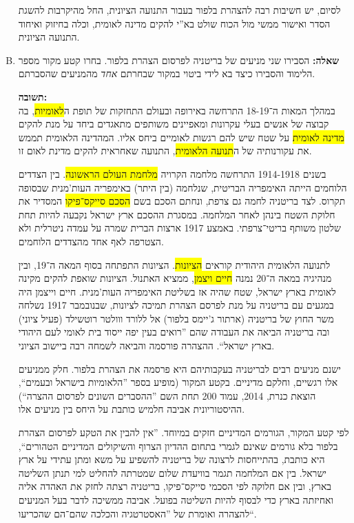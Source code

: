 \documentclass[a4paper]{article}
\newcommand\hl[1]   {\colorbox{yellow}{\!\!#1\!\!}}
\begin{document}
\begin{enumerate}[A.]
			לסיום, יש חשיבות רבה להצהרת בלפור בעבור התנועה הציונית, החל מהיקרבות להשגת הסדר ואישור ממשי מול הכוח שולט בא''י להקים מדינה לאומית, וכלה בחיזוק ואיחוד התנועה הציונית. 
			
			\item \textbf{שאלה: }הסבירו שני מניעים של בריטניה לפרסום הצהרת בלפור. בחרו קטע מקור מספר הלימוד והסבירו כיצד בא לידי ביטוי במקור שבחרתם \textit{אחד} מהמניעים שהסברתם. 
			
			\textbf{תשובה: }\\
			במהלך המאות ה־18-19 התרחשה באירופה ובעולם התחזקות של תופת ה\hl{לאומיות}, בה קבוצה של אנשים בעלי עקרונות ומאפיינים משותפים מתאגדים ביחד על מנת להקים \hl{מדינה לאומית} על שטח שיש להם רגשות לאומיים ביחס אליו. המהדינה הלאומית תממש את עקורנותיה של ה\hl{תנועה הלאומית}, התנועה שאחראית להקים מדינת לאום זו. 
			
			בשנים 1914-1918 התרחשה מלחמה הקרויה \hl{מלחמת העולם הראשונה}. בין הצדדים הלוחמים הייתה האימפריה הבריטית, שנלחמה (בין היתר) באימפריה העות'מנית שבסופה תקרוס. לצד בריטניה לחמה גם צרפת, ונחתם הסכם בשם \hl{הסכם סייקס־פיקו} המסדיר את חלוקת השטח בינהן לאחר המלחמה. במסגרת ההסכם ארץ ישראל נקבעה להיות תחת שלטון משותף בריטי־צרפתי. באמצע 1917 ארצות הברית שמרה על עמדה ניטרלית ולא הצטרפה לאף אחד מהצדדים הלוחמים. 
			
			לתנועה הלאומית היהודית קוראים \hl{הציונות}. הציונות התפתחה בסוף המאה ה־19, ובין מנהיגיה במאה ה־20 נמנה \hl{חיים ויצמן}, ממציא האתנול. הציונות שואפת להקים מקינה לאומית בארץ ישראל, שטח שהיה אז בשליטת האימפריה העות'מנית. חיים וייצמן היה במגעים עם בריטניה על מנת לפרסם הצהרת תמיכה לציונות, שבנובמבר 1917 נשלחה משר החוץ של בריטניה (ארתור ג'יימס בלפור) אל ללורד ווולטר רוטשילד (פעיל ציוני) ובה בריטניה הביאה את העבודה שהם ''רואים בעין יפה ייסוד בית לאומי לעם היהודי בארץ ישראל``. ההצהרה פורסמה והביאה לשמחה רבה ביישוב הציוני. 
			
			ישנם מניעים רבים לבריטניה בעקבותיהם היא פרסמה את הצהרת בלפור. חלק ממניעים אלו רגשיים, וחלקם מדיניים. בקטע המקור (מופיע בספר ''הלאומיות בישראל ובעמים``, הוצאת כנרת, 2014, עמוד 200 תחת השם ''ההסברים השונים לפרסום ההצרה``) ההיסטוריונית אביבה חלמיש כותבת על היחס בין מניעים אלו. 
			
			לפי קטע המקור, הגורמים המדיניים חזקים במיוחד. ''אין להבין את הטקע לפרסום הצהרת בלפור בלא גורמים שאינם לגמרי בתחום ההדיון הצרוף והשיקולים המדיניים הטהורים``, היא כותבת, בהתייחסות לרצונה של בריטניה להשפיע על משא ומתן עתידי על ארץ ישראל. בין אם המלחמה תגמר בוויעדת שלום שמטרתה להחליט למי תנתן השליטה בארץ, ובין אם חלוקה לפי הסכמי סייקס־פיקו, בריטניה רצתה לחזק את האהדה אליה ואחיזתה בארץ כדי לבסוף להיות השליטה בפועל. אביבה ממשיכה לדבר בעל המניעים להצהרה ואומרת של ''האסטרטגיה והכלכה שהם־הם שהכריעו``. 
			

\end{enumerate}
\end{document}
